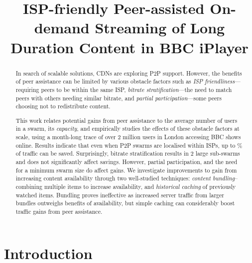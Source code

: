 \documentclass[10pt, conference, letterpaper]{IEEEtran}
\begin{document}
\title{ISP-friendly Peer-assisted On-demand Streaming of Long Duration Content in BBC iPlayer}

\author{
}

\maketitle


\begin{abstract}

In search of scalable solutions, CDNs  are exploring P2P support. However, the  benefits of peer assistance can be limited by various obstacle factors such as \emph{ISP friendliness}---requiring peers to be within the same ISP, \emph{bitrate stratification}---the need to match peers with others needing similar bitrate, and \emph{partial participation}---some peers choosing not to redistribute content. 

This work relates potential gains from peer assistance to the average number of users in a swarm, its \emph{capacity}, and empirically studies the effects of these obstacle factors at scale, using a month-long trace of over 2 million users in London accessing BBC shows online. Results indicate that even when P2P swarms are localised within ISPs, up to \% of traffic can be saved. Surprisingly, bitrate stratification results in 2 large sub-swarms and does not significantly affect savings. However, partial participation, and the need for a minimum swarm size do affect gains. We investigate improvements to gain from increasing content availability through two well-studied techniques: \emph{content bundling}--combining multiple items to increase availability, and \emph{historical caching} of previously watched items. Bundling proves ineffective as increased server traffic from larger bundles outweighs benefits of availability, but simple caching can considerably boost traffic gains from peer assistance. 

\end{abstract} \section{Introduction}
\end{document}
